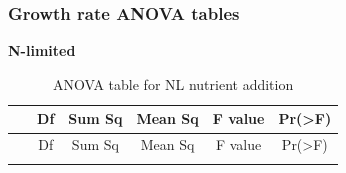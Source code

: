 \documentclass[]{article}
\begin{document}
\newpage

\subsubsection{Growth rate ANOVA tables}\label{growth-rate-anova-tables}

\textbf{N-limited}

\begin{longtable}[]{@{}cccccc@{}}
\caption{ANOVA table for NL nutrient addition}\tabularnewline
\toprule
\begin{minipage}[b]{0.19\columnwidth}\centering\strut
~\strut
\end{minipage} & \begin{minipage}[b]{0.06\columnwidth}\centering\strut
Df\strut
\end{minipage} & \begin{minipage}[b]{0.10\columnwidth}\centering\strut
Sum Sq\strut
\end{minipage} & \begin{minipage}[b]{0.12\columnwidth}\centering\strut
Mean Sq\strut
\end{minipage} & \begin{minipage}[b]{0.12\columnwidth}\centering\strut
F value\strut
\end{minipage} & \begin{minipage}[b]{0.12\columnwidth}\centering\strut
Pr(\textgreater{}F)\strut
\end{minipage}\tabularnewline
\midrule
\endfirsthead
\toprule
\begin{minipage}[b]{0.19\columnwidth}\centering\strut
~\strut
\end{minipage} & \begin{minipage}[b]{0.06\columnwidth}\centering\strut
Df\strut
\end{minipage} & \begin{minipage}[b]{0.10\columnwidth}\centering\strut
Sum Sq\strut
\end{minipage} & \begin{minipage}[b]{0.12\columnwidth}\centering\strut
Mean Sq\strut
\end{minipage} & \begin{minipage}[b]{0.12\columnwidth}\centering\strut
F value\strut
\end{minipage} & \begin{minipage}[b]{0.12\columnwidth}\centering\strut
Pr(\textgreater{}F)\strut
\end{minipage}\tabularnewline
\midrule
\endhead
\begin{minipage}[t]{0.19\columnwidth}\centering\strut

\end{minipage}
\end{longtable}
\end{document}
